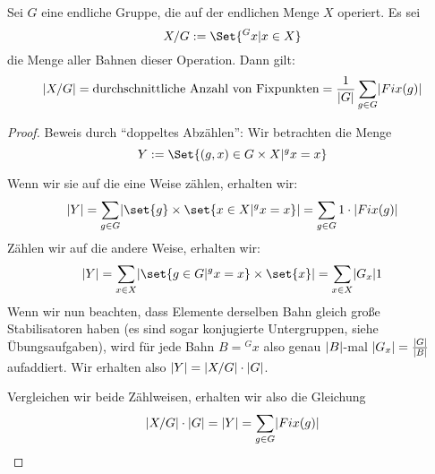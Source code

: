 \begin{theorem}
Sei $G$ eine endliche Gruppe, die auf der endlichen Menge $X$ operiert. Es sei
\[X/G := \Set{{^G x} | x\in X}\]
die Menge aller Bahnen dieser Operation. Dann gilt:
\[\lvert X/G\rvert = \text{durchschnittliche Anzahl von Fixpunkten} = \frac{1}{\lvert G\rvert} \sum_{g\in G} \lvert Fix(g)\rvert\]
\end{theorem}
\begin{proof}
Beweis durch \enquote{doppeltes Abzählen}: Wir betrachten die Menge
\[Y:=\Set{(g,x)\in G\times X | {^g x} =x}\]

Wenn wir sie auf die eine Weise zählen, erhalten wir:
\[\abs{Y} = \sum_{g\in G} \abs{\set{g}\times\set{x\in X | {^g x}=x}} = \sum_{g\in G} 1\cdot\abs{Fix(g)}\]
Zählen wir auf die andere Weise, erhalten wir:
\[\abs{Y} = \sum_{x\in X} \abs{\set{g\in G | {^g x}=x}\times\set{x}} = \sum_{x\in X} \abs{G_x}1 \]
Wenn wir nun beachten, dass Elemente derselben Bahn gleich große Stabilisatoren haben (es sind sogar konjugierte Untergruppen, siehe Übungsaufgaben), wird für jede Bahn $B={^G x}$ also genau $\lvert B\rvert$-mal $\lvert G_x\rvert=\frac{\lvert G\rvert}{\lvert B\rvert}$ aufaddiert. Wir erhalten also $\lvert Y\rvert = \lvert X/G\rvert\cdot \lvert G\rvert$.

Vergleichen wir beide Zählweisen, erhalten wir also die Gleichung
\[\lvert X/G\rvert \cdot\lvert G\rvert = \lvert Y\rvert = \sum_{g\in G} \lvert Fix(g)\rvert \qedhere\]
\end{proof}